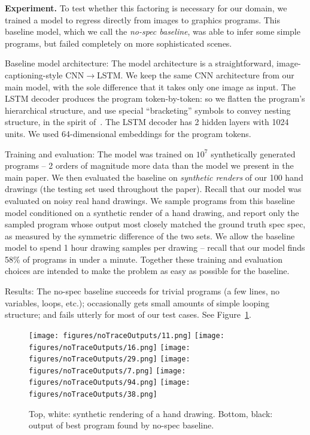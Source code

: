 \documentclass{article}
\theoremstyle{definition}
\begin{document}
\textbf{Experiment.} To test whether this factoring is necessary for our domain, we trained a model to regress directly from images to graphics programs. This baseline model, which we call the \emph{no-spec baseline}, was able to infer some simple programs, but failed completely on more sophisticated scenes.

Baseline model architecture: The model architecture is a straightforward, image-captioning-style CNN$\to$LSTM. We keep the same CNN architecture from our main model, with the sole difference that it takes only one image as input. The LSTM decoder produces the program token-by-token: so we flatten the program's hierarchical structure, and use special ``bracketing'' symbols to convey nesting structure, in the spirit of~\citep{vinyals2015grammar}. The LSTM decoder has 2 hidden layers with 1024 units. We used 64-dimensional embeddings for the program tokens.

Training and evaluation: The model was trained on $10^7$ synthetically generated programs -- 2 orders of magnitude more data than the model we present in the main paper. We then evaluated the baseline on \emph{synthetic renders} of our 100 hand drawings (the testing set used throughout the paper). Recall that our model was evaluated on noisy real hand drawings. We sample programs from this baseline model conditioned on a synthetic render of a hand drawing, and report only the sampled program whose output most closely matched the ground truth spec spec, as measured by the symmetric difference of the two sets. We allow the baseline model to spend 1 hour drawing samples per drawing -- recall that our model finds 58\% of programs in under a minute. Together these training and evaluation choices are intended to make the problem as easy as possible for the baseline.

Results: The no-spec baseline succeeds for trivial programs (a few lines, no variables, loops, etc.); occasionally gets small amounts of simple looping structure; and fails utterly for most of our test cases. See Figure~\ref{noSpec}.

\begin{figure}[h]\centering
      \texttt{[image: figures/noTraceOutputs/11.png]}
  \texttt{[image: figures/noTraceOutputs/16.png]}
    \texttt{[image: figures/noTraceOutputs/29.png]}
    \texttt{[image: figures/noTraceOutputs/7.png]}
        \texttt{[image: figures/noTraceOutputs/94.png]}
      \texttt{[image: figures/noTraceOutputs/38.png]}
  \caption{Top, white: synthetic rendering of a hand drawing. Bottom, black: output of best program found by no-spec baseline.}\label{noSpec}
  \end{figure}
\end{document}
